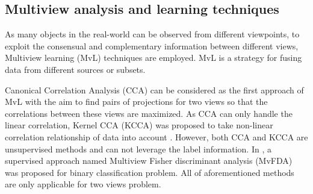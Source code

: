 
    \subsection{Multiview analysis and learning techniques}
        As many objects in the real-world can be observed from different viewpoints, to exploit the consensual and complementary information between different views, Multiview learning (MvL) techniques are employed.
        MvL is a strategy for fusing data from different sources or subsets.

        Canonical Correlation Analysis (CCA) \cite{Hotelling} can be considered as the first approach of MvL with the aim to find pairs of projections for two views so that the correlations between these views are maximized.
        As CCA can only handle the linear correlation, Kernel CCA (KCCA) was proposed to take non-linear correlation relationship of data into account \cite{Akaho2006}.
        However, both CCA and KCCA are unsupervised methods and can not leverage the label information.
        In \cite{diethe2008multiview}, a supervised approach named Multiview Fisher discriminant analysis (MvFDA) was proposed for binary classification problem.
        All of aforementioned methods are only applicable for two views problem.

